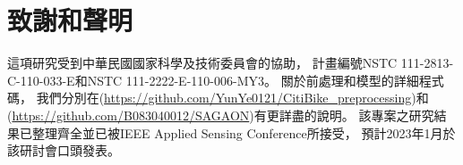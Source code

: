 \documentclass[a4paper,14pt]{extarticle}
\begin{document}
    \newpage
    \section{致謝和聲明}
        
        這項研究受到中華民國國家科學及技術委員會的協助，
        計畫編號NSTC 111-2813-C-110-033-E和NSTC 111-2222-E-110-006-MY3。
        關於前處理和模型的詳細程式碼，
        我們分別在(\url{https://github.com/YunYe0121/CitiBike_preprocessing})和(\url{https://github.com/B083040012/SAGAON})有更詳盡的說明。
        該專案之研究結果已整理齊全並已被IEEE Applied Sensing Conference\cite{SAGAON}所接受，
        預計2023年1月於該研討會口頭發表。

    \clearpage
        \renewcommand\refname{\arabic{section}\hspace{1em}參考文獻}
        
        
\end{document}
